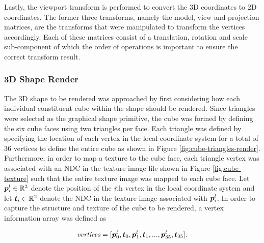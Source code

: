Lastly, the viewport transform is performed to convert the 3D coordinates to 2D coordinates. The former three transforms, namely the model, view and projection matrices, are the transforms that were manipulated to transform the vertices accordingly. Each of these matrices consist of a translation, rotation and scale sub-component of which the order of operations is important to ensure the correct transform result.


\subsubsection{3D Shape Render}

The 3D shape to be rendered was approached by first considering how each individual constituent cube within the shape should be rendered. Since triangles were selected as the graphical shape primitive, the cube was formed by defining the six cube faces using two triangles per face. Each triangle was defined by specifying the location of each vertex in the local coordinate system for a total of 36 vertices to define the entire cube as shown in Figure \ref{fig:cube-triangles-render}. Furthermore, in order to map a texture to the cube face, each triangle vertex was associated with an NDC in the texture image file shown in Figure \ref{fig:cube-texture} such that the entire texture image was mapped to each cube face. Let $\bm{p}^l_i\in\mathbb{R}^3$ denote the position of the \textit{i}th vertex in the local coordinate system and let $\bm{t}_i\in\mathbb{R}^2$ denote the NDC in the texture image associated with $\bm{p}^l_i$. In order to capture the structure and texture of the cube to be rendered, a vertex information array was defined as

\begin{equation}
	\textit{vertices}=[\bm{p}^l_0, \bm{t}_0, \bm{p}^l_1, \bm{t}_1,...,\bm{p}^l_{35}, \bm{t}_{35}].
	\label{eqn:vertex-array}
\end{equation}

